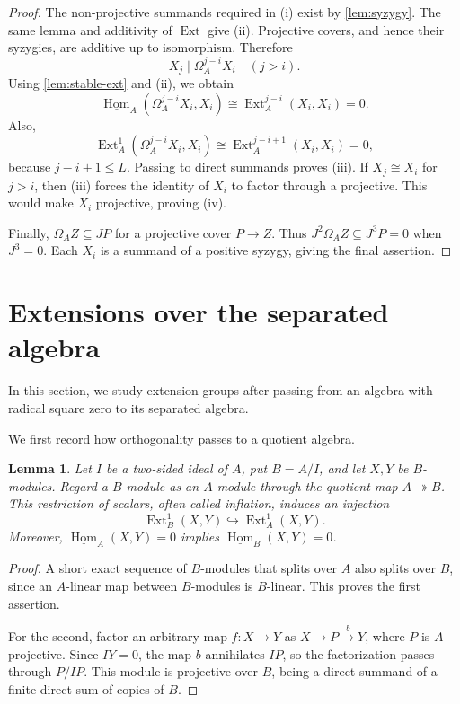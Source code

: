 \documentclass[a4paper,reqno]{amsart}
\numberwithin{equation}{section}
\newtheorem{lemma}[lemma]{Lemma}
\newcommand{\Ext}{\operatorname{Ext}}
\newcommand{\Hom}{\operatorname{Hom}}
\newcommand{\stableHom}{\underline{\Hom}}
\begin{document}
\begin{proof}
The non-projective summands required in (i) exist by
\cref{lem:syzygy}. The same lemma and additivity of $\Ext$ give (ii).
Projective covers, and hence their syzygies, are additive up to
isomorphism. Therefore
\[
 X_j\mid\Omega_A^{j-i}X_i\quad(j>i).
\]
Using \cref{lem:stable-ext} and (ii), we obtain
\[
 \stableHom_A(\Omega_A^{j-i}X_i,X_i)
 \cong\Ext_A^{j-i}(X_i,X_i)=0.
\]
Also,
\[
 \Ext_A^1(\Omega_A^{j-i}X_i,X_i)
 \cong\Ext_A^{j-i+1}(X_i,X_i)=0,
\]
because $j-i+1\le L$. Passing to direct summands proves (iii).
If $X_j\cong X_i$ for $j>i$, then (iii) forces the identity of $X_i$
to factor through a projective. This would make $X_i$ projective,
proving (iv).

Finally, $\Omega_A Z\subseteq JP$ for a projective cover $P\to Z$.
Thus $J^2\Omega_A Z\subseteq J^3P=0$ when $J^3=0$. Each $X_i$ is a
summand of a positive syzygy, giving the final assertion.
\end{proof}

\section{Extensions over the separated algebra}

In this section, we study extension groups after passing from an algebra with radical square zero to its separated algebra.

We first record how orthogonality passes to a quotient algebra.

\begin{lemma}\label{lem:quotient}
Let $I$ be a two-sided ideal of $A$, put $B=A/I$, and let $X,Y$ be
$B$-modules. Regard a $B$-module as an $A$-module through the quotient map
$A\twoheadrightarrow B$. This restriction of scalars, often called
inflation, induces an injection
\[
 \Ext_B^1(X,Y)\hookrightarrow\Ext_A^1(X,Y).
\]
Moreover, $\stableHom_A(X,Y)=0$ implies
$\stableHom_B(X,Y)=0$.
\end{lemma}

\begin{proof}
A short exact sequence of $B$-modules that splits over $A$ also
splits over $B$, since an $A$-linear map between $B$-modules is
$B$-linear. This proves the first assertion.

For the second, factor an arbitrary map $f:X\to Y$ as
$X\to P\xrightarrow{b}Y$, where $P$ is $A$-projective. Since $IY=0$,
the map $b$ annihilates $IP$, so the factorization passes through
$P/IP$. This module is projective over $B$, being a direct summand
of a finite direct sum of copies of $B$.
\end{proof}
\end{document}
